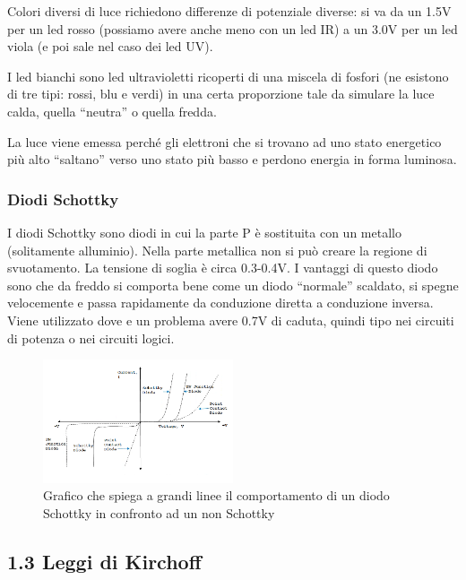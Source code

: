 \documentclass[
]{article}
\begin{document}
Colori diversi di luce richiedono differenze di potenziale diverse: si
va da un 1.5V per un led rosso (possiamo avere anche meno con un led IR)
a un 3.0V per un led viola (e poi sale nel caso dei led UV).

I led bianchi sono led ultravioletti ricoperti di una miscela di fosfori
(ne esistono di tre tipi: rossi, blu e verdi) in una certa proporzione
tale da simulare la luce calda, quella ``neutra'' o quella fredda.

La luce viene emessa perché gli elettroni che si trovano ad uno stato
energetico più alto ``saltano'' verso uno stato più basso e perdono
energia in forma luminosa.

\subsubsection{Diodi Schottky}\label{diodi-schottky}

I diodi Schottky sono diodi in cui la parte P è sostituita con un
metallo (solitamente alluminio). Nella parte metallica non si può creare
la regione di svuotamento. La tensione di soglia è circa 0.3-0.4V. I
vantaggi di questo diodo sono che da freddo si comporta bene come un
diodo ``normale'' scaldato, si spegne velocemente e passa rapidamente da
conduzione diretta a conduzione inversa. \newline Viene utilizzato dove
e un problema avere 0.7V di caduta, quindi tipo nei circuiti di potenza
o nei circuiti logici.

\begin{figure}
\centering
\includegraphics[width=0.5\textwidth,height=\textheight]{immagini/6.png}
\caption{Grafico che spiega a grandi linee il comportamento di un diodo
Schottky in confronto ad un non Schottky}
\end{figure}

\subsection{1.3 Leggi di Kirchoff}\label{leggi-di-kirchoff}
\end{document}
